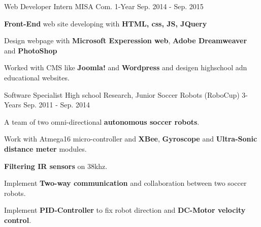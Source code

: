 \begin{cventries}
  \cventry
    {Web Developer Intern} %
    {MISA Com.} %
    {1-Year} %
    {Sep. 2014 - Sep. 2015} %
    {
      \begin{cvitems} %
        \item {\textbf{Front-End} web site developing with \textbf{HTML, css, JS, JQuery}}
        \item {Design webpage with \textbf{Microsoft Experession web}, \textbf{Adobe Dreamweaver} and \textbf{PhotoShop}}
        \item {Worked with CMS like \textbf{Joomla!} and \textbf{Wordpress} and desigen highschool adn educational websites.}
      \end{cvitems}
    }
    
  \cventry
    {Software Specialist} %
    {High school Research, Junior Soccer Robots (RoboCup)} %
    {3-Years} %
    {Sep. 2011 - Sep. 2014} %
    {
      \begin{cvitems} %
        \item {A team of two omni-directional \textbf{autonomous soccer robots}.}
        \item {Work with Atmega16 micro-controller and \textbf{XBee}, \textbf{Gyroscope} and \textbf{Ultra-Sonic distance meter} modules.}
        \item {\textbf{Filtering IR sensors} on 38khz.}
        \item {Implement \textbf{Two-way communication} and collaboration between two soccer robots.}
        \item {Implement \textbf{PID-Controller} to fix robot direction and \textbf{DC-Motor velocity control}.}
      \end{cvitems}
    }


\end{cventries}
